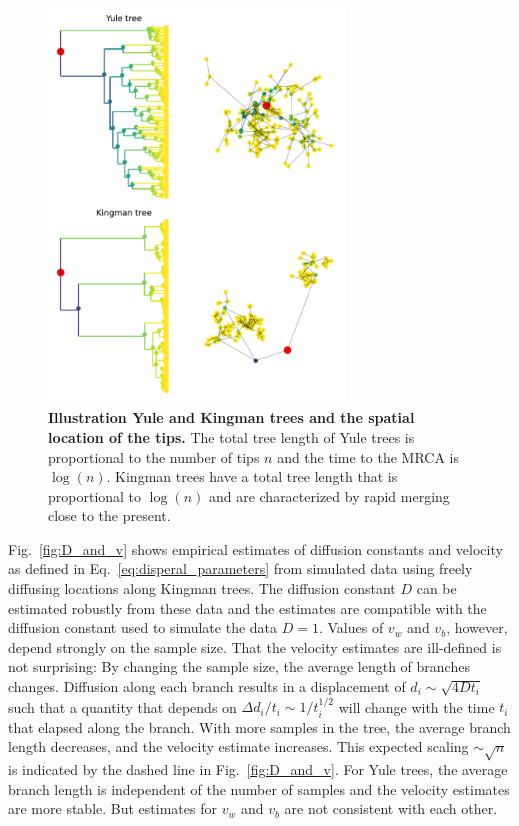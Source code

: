 \documentclass[aps,rmp, twocolumn]{revtex4}
\begin{document}
\begin{figure}[tb]
    \includegraphics*[width=0.7\textwidth]{figures/illustration_tree.pdf}
    \caption{\label{fig:illustration_tree}{\bf Illustration Yule and Kingman trees and the spatial location of the tips.}
    The total tree length of Yule trees is proportional to the number of tips $n$ and the time to the MRCA is $\log(n)$.
    Kingman trees have a total tree length that is proportional to $\log(n)$ and are characterized by rapid merging close to the present. }
\end{figure}


Fig.~\ref{fig:D_and_v} shows empirical estimates of diffusion constants and velocity as defined in Eq.~\ref{eq:disperal_parameters} from simulated data using freely diffusing locations along Kingman trees.
The diffusion constant $D$ can be estimated robustly from these data and the estimates are compatible with the diffusion constant used to simulate the data $D=1$.
Values of $v_w$ and $v_b$, however, depend strongly on the sample size.
That the velocity estimates are ill-defined is not surprising: By changing the sample size, the average length of branches changes. Diffusion along each branch results in a displacement of $d_i \sim \sqrt{4Dt_i}$ such that a quantity that depends on $\Delta d_i / t_i \sim 1/t_i^{1/2}$ will change with the time $t_i$ that elapsed along the branch.
With more samples in the tree, the average branch length decreases, and the velocity estimate increases.
This expected scaling $\sim \sqrt{n}$ is indicated by the dashed line in Fig.~\ref{fig:D_and_v}.
For Yule trees, the average branch length is independent of the number of samples and the velocity estimates are more stable.
But estimates for $v_w$ and $v_b$ are not consistent with each other.
\end{document}
